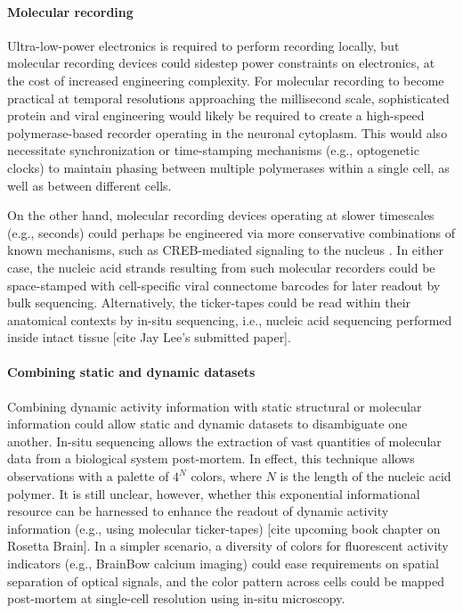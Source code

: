 \paragraph{Molecular recording} Ultra-low-power electronics is required to perform recording locally, but molecular recording devices could sidestep power constraints on electronics, at the cost of increased engineering complexity. For molecular recording to become practical at temporal resolutions approaching the millisecond scale, sophisticated protein and viral engineering would likely be required to create a high-speed polymerase-based recorder operating in the neuronal cytoplasm. This would also necessitate synchronization or time-stamping mechanisms (e.g., optogenetic clocks) to maintain phasing between multiple polymerases within a single cell, as well as between different cells. 

On the other hand, molecular recording devices operating at slower timescales (e.g., seconds) could perhaps be engineered via more conservative combinations of known mechanisms, such as CREB-mediated signaling to the nucleus \cite{Deisseroth2012}. In either case, the nucleic acid strands resulting from such molecular recorders could be space-stamped with cell-specific viral connectome barcodes for later readout by bulk sequencing. Alternatively, the ticker-tapes could be read within their anatomical contexts by in-situ sequencing, i.e., nucleic acid sequencing performed inside intact tissue [cite Jay Lee's submitted paper].

\paragraph{Combining static and dynamic datasets} Combining dynamic activity information with static structural or molecular information could allow static and dynamic datasets to disambiguate one another. In-situ sequencing allows the extraction of vast quantities of molecular data from a biological system post-mortem. In effect, this technique allows observations with a palette of $4^N$ colors, where $N$ is the length of the nucleic acid polymer. It is still unclear, however, whether this exponential informational resource can be harnessed to enhance the readout of dynamic activity information (e.g., using molecular ticker-tapes) [cite upcoming book chapter on Rosetta Brain]. In a simpler scenario, a diversity of colors for fluorescent activity indicators (e.g., BrainBow calcium imaging) could ease requirements on spatial separation of optical signals, and the color pattern across cells could be mapped post-mortem at single-cell resolution using in-situ microscopy.

